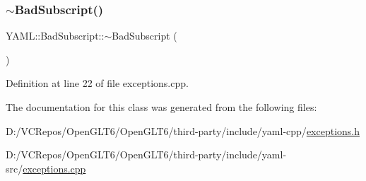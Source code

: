\subsubsection{\texorpdfstring{$\sim$BadSubscript()}{~BadSubscript()}}
{\footnotesize\ttfamily Y\+A\+M\+L\+::\+Bad\+Subscript\+::$\sim$\+Bad\+Subscript (\begin{DoxyParamCaption}{ }\end{DoxyParamCaption})\hspace{0.3cm}{\ttfamily [virtual]}}



Definition at line 22 of file exceptions.\+cpp.



The documentation for this class was generated from the following files\+:\begin{DoxyCompactItemize}
\item 
D\+:/\+V\+C\+Repos/\+Open\+G\+L\+T6/\+Open\+G\+L\+T6/third-\/party/include/yaml-\/cpp/\mbox{\hyperlink{exceptions_8h}{exceptions.\+h}}\item 
D\+:/\+V\+C\+Repos/\+Open\+G\+L\+T6/\+Open\+G\+L\+T6/third-\/party/include/yaml-\/src/\mbox{\hyperlink{exceptions_8cpp}{exceptions.\+cpp}}\end{DoxyCompactItemize}

